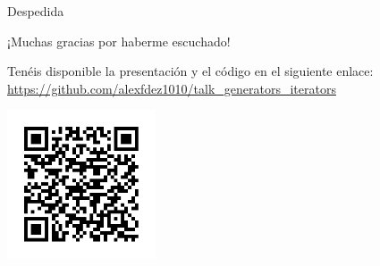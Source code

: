 \documentclass[12pt]{beamer}
\begin{document}
\begin{frame}{Despedida}
    \begin{center}
        ¡Muchas gracias por haberme escuchado! 
    \end{center}
    \begin{center}
        Tenéis disponible la presentación y el código en el siguiente enlace: \url{https://github.com/alexfdez1010/talk_generators_iterators}
    \end{center}
    \begin{center}
        \includegraphics[width=0.33\textwidth]{qr.png}
    \end{center}
\end{frame}
\end{document}

